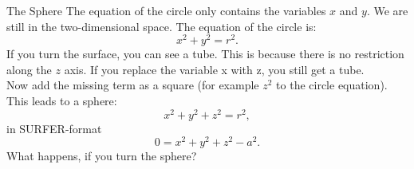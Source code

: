 \begin{surferPage}{The Sphere}
The equation of the circle only contains the variables $x$ and $y$. We are still in the two-dimensional space.
The equation of the circle is:
\[x^2+y^2=r^2.\]
If you turn the surface, you can see a tube. This is because there is no restriction along the $z$ axis. If you replace the variable x with z, you still get a tube.\\
Now add the missing term as a square (for example $z^2$ to the circle equation). 
This leads to a sphere:
\[x^2+y^2+z^2=r^2,\]
in SURFER-format
\[0=x^2+y^2+z^2-a^2.\]
What happens, if you turn the sphere?
\end{surferPage}
